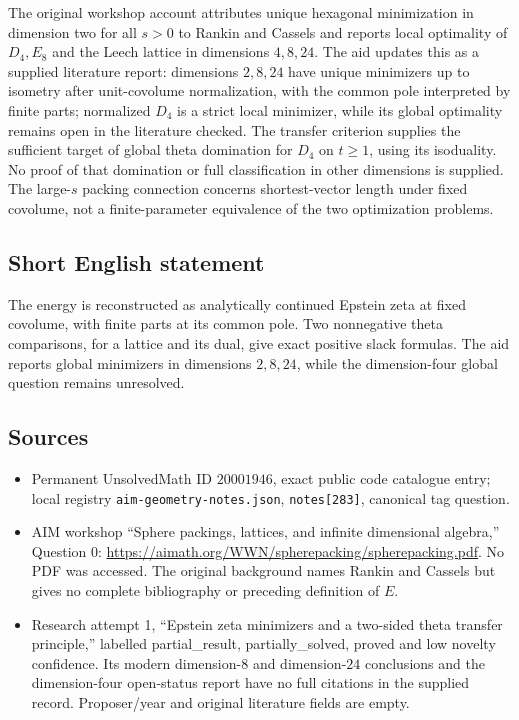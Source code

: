 \documentclass[11pt]{article}
\begin{document}
The original workshop account attributes unique hexagonal minimization in dimension two for all \(s>0\) to Rankin and Cassels and reports local optimality of \(D_4,E_8\) and the Leech lattice in dimensions \(4,8,24\). The aid updates this as a supplied literature report: dimensions \(2,8,24\) have unique minimizers up to isometry after unit-covolume normalization, with the common pole interpreted by finite parts; normalized \(D_4\) is a strict local minimizer, while its global optimality remains open in the literature checked. The transfer criterion supplies the sufficient target of global theta domination for \(D_4\) on \(t\geq1\), using its isoduality. No proof of that domination or full classification in other dimensions is supplied. The large-\(s\) packing connection concerns shortest-vector length under fixed covolume, not a finite-parameter equivalence of the two optimization problems.
\subsection{Short English statement}
The energy is reconstructed as analytically continued Epstein zeta at fixed covolume, with finite parts at its common pole. Two nonnegative theta comparisons, for a lattice and its dual, give exact positive slack formulas. The aid reports global minimizers in dimensions \(2,8,24\), while the dimension-four global question remains unresolved.
\subsection{Sources}
\begin{itemize}
\item Permanent UnsolvedMath ID \(20001946\), exact public code catalogue entry; local registry \texttt{aim-geometry-notes.json}, \texttt{notes[283]}, canonical tag question.
\item AIM workshop ``Sphere packings, lattices, and infinite dimensional algebra,'' Question 0: \url{https://aimath.org/WWN/spherepacking/spherepacking.pdf}. No PDF was accessed. The original background names Rankin and Cassels but gives no complete bibliography or preceding definition of \(E\).
\item Research attempt 1, ``Epstein zeta minimizers and a two-sided theta transfer principle,'' labelled partial\_result, partially\_solved, proved and low novelty confidence. Its modern dimension-\(8\) and dimension-\(24\) conclusions and the dimension-four open-status report have no full citations in the supplied record. Proposer/year and original literature fields are empty.
\end{itemize}
\end{document}
